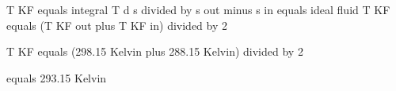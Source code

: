 T KF equals integral T d s divided by s out minus s in equals ideal fluid  
T KF equals (T KF out plus T KF in) divided by 2  

T KF equals (298.15 Kelvin plus 288.15 Kelvin) divided by 2  

equals 293.15 Kelvin